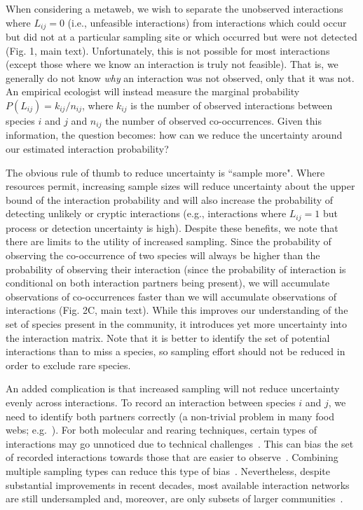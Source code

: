 \documentclass[12pt]{article}
\begin{document}
        When considering a metaweb, we wish to separate the unobserved interactions where $L_{ij} = 0$ (i.e., unfeasible interactions) from interactions which could occur but did not at a particular sampling site or which occurred but were not detected (Fig. 1, main text). Unfortunately, this is not possible for most interactions (except those where we know an interaction is truly not feasible). That is, we generally do not know \emph{why} an interaction was not observed, only that it was not. An empirical ecologist will instead measure the marginal probability $P(L_{ij}) = k_{ij}/n_{ij}$, where $k_{ij}$ is the number of observed interactions between species $i$ and $j$ and $n_{ij}$ the number of observed co-occurrences. Given this information, the question becomes: how can we reduce the uncertainty around our estimated interaction probability?


        The obvious rule of thumb to reduce uncertainty is ``sample more". Where resources permit, increasing sample sizes will reduce uncertainty about the upper bound of the interaction probability and will also increase the probability of detecting unlikely or cryptic interactions (e.g., interactions where $L_{ij} = 1$ but process or detection uncertainty is high). Despite these benefits, we note that there are limits to the utility of increased sampling. Since the probability of observing the co-occurrence of two species will always be higher than the probability of observing their interaction (since the probability of interaction is conditional on both interaction partners being present), we will accumulate observations of co-occurrences faster than we will accumulate observations of interactions (Fig. 2C, main text). While this improves our understanding of the set of species present in the community, it introduces yet more uncertainty into the interaction matrix. Note that it is better to identify the set of potential interactions than to miss a species, so sampling effort should not be reduced in order to exclude rare species.


        An added complication is that increased sampling will not reduce uncertainty evenly across interactions. To record an interaction between species $i$ and $j$, we need to identify both partners correctly (a non-trivial problem in many food webs; e.g.~\citealp{Kaartinen2011,Roslin2016}). For both molecular and rearing techniques, certain types of interactions may go unnoticed due to technical challenges~\citep{Wirta2014}. This can bias the set of recorded interactions towards those that are easier to observe~\citep{Carstensen2014,Jordano2016}. Combining multiple sampling types can reduce this type of bias~\citep{Wirta2014,Jordano2016}. Nevertheless, despite substantial improvements in recent decades, most available interaction networks are still undersampled and, moreover, are only subsets of larger communities~\citep{Bartomeus2013,Jordano2016}. 
\end{document}
